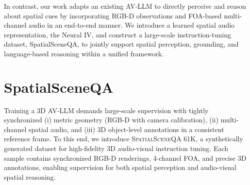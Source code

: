 In contrast, our work adapts an existing AV-LLM to directly perceive and reason about spatial cues by incorporating RGB-D observations and FOA-based multi-channel audio in an end-to-end manner. We introduce a learned spatial audio representation, the Neural IV, and construct a large-scale instruction-tuning dataset, SpatialSceneQA, to jointly support spatial perception, grounding, and language-based reasoning within a unified framework.
\section{SpatialSceneQA}

Training a 3D AV-LLM demands large-scale supervision with tightly synchronized (i) metric geometry (RGB-D with camera calibration), (ii) multi-channel spatial audio, and (iii) 3D object-level annotations in a consistent reference frame. 
To this end, we introduce \textsc{SpatialSceneQA} 61K, a synthetically generated dataset for high-fidelity 3D audio-visual instruction tuning. 
Each sample contains synchronized RGB-D renderings, 4-channel FOA, and precise 3D annotations, enabling supervision for both spatial perception and audio-visual spatial reasoning.

